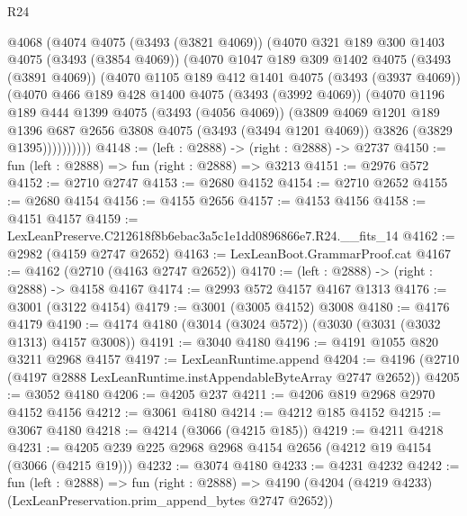 \begin{lexlean}{R24}
\begin{coremodule}
      @4068
        (@4074
          @4075
          (@3493 (@3821 @4069))
          (@4070
            @321
            @189
            @300
            @1403
            @4075
            (@3493 (@3854 @4069))
            (@4070
              @1047
              @189
              @309
              @1402
              @4075
              (@3493 (@3891 @4069))
              (@4070
                @1105
                @189
                @412
                @1401
                @4075
                (@3493 (@3937 @4069))
                (@4070
                  @466
                  @189
                  @428
                  @1400
                  @4075
                  (@3493 (@3992 @4069))
                  (@4070
                    @1196
                    @189
                    @444
                    @1399
                    @4075
                    (@3493 (@4056 @4069))
                    (@3809
                      @4069
                      @1201
                      @189
                      @1396
                      @687
                      @2656
                      @3808
                      @4075
                      (@3493 (@3494 @1201 @4069))
                      @3826
                      (@3829 @1395))))))))))
@4148 := (left : @2888) -> (right : @2888) -> @2737
@4150 := fun (left : @2888) => fun (right : @2888) => @3213
@4151 := @2976 @572
@4152 := @2710 @2747
@4153 := @2680 @4152
@4154 := @2710 @2652
@4155 := @2680 @4154
@4156 := @4155 @2656
@4157 := @4153 @4156
@4158 := @4151 @4157
@4159 := LexLeanPreserve.C212618f8b6ebac3a5c1e1dd0896866e7.R24.__fits_14
@4162 := @2982 (@4159 @2747 @2652)
@4163 := LexLeanBoot.GrammarProof.cat
@4167 := @4162 (@2710 (@4163 @2747 @2652))
@4170 := (left : @2888) -> (right : @2888) -> @4158 @4167
@4174 := @2993 @572 @4157 @4167 @1313
@4176 := @3001 (@3122 @4154)
@4179 := @3001 (@3005 @4152) @3008
@4180 := @4176 @4179
@4190 := @4174 @4180 (@3014 (@3024 @572)) (@3030 (@3031 (@3032 @1313) @4157 @3008))
@4191 := @3040 @4180
@4196 := @4191 @1055 @820 @3211 @2968 @4157
@4197 := LexLeanRuntime.append
@4204 := @4196 (@2710 (@4197 @2888 LexLeanRuntime.instAppendableByteArray @2747 @2652))
@4205 := @3052 @4180
@4206 := @4205 @237
@4211 := @4206 @819 @2968 @2970 @4152 @4156
@4212 := @3061 @4180
@4214 := @4212 @185 @4152
@4215 := @3067 @4180
@4218 := @4214 (@3066 (@4215 @185))
@4219 := @4211 @4218
@4231 := @4205 @239 @225 @2968 @2968 @4154 @2656 (@4212 @19 @4154 (@3066 (@4215 @19)))
@4232 := @3074 @4180
@4233 := @4231 @4232
@4242 := fun (left : @2888) =>
  fun (right : @2888) =>
  @4190 (@4204 (@4219 @4233) (LexLeanPreservation.prim_append_bytes @2747 @2652))

\end{coremodule}
\end{lexlean}
